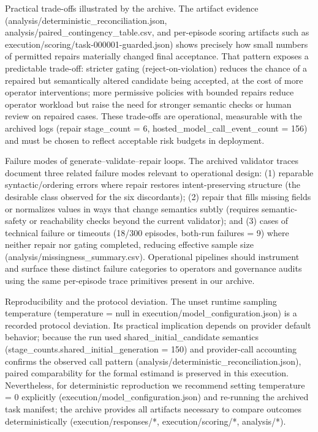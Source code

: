 \documentclass[conference]{IEEEtran}
\begin{document}
Practical trade-offs illustrated by the archive. The artifact evidence (analysis/deterministic\_reconciliation.json, analysis/paired\_contingency\_table.csv, and per-episode scoring artifacts such as execution/scoring/task-000001-guarded.json) shows precisely how small numbers of permitted repairs materially changed final acceptance. That pattern exposes a predictable trade-off: stricter gating (reject-on-violation) reduces the chance of a repaired but semantically altered candidate being accepted, at the cost of more operator interventions; more permissive policies with bounded repairs reduce operator workload but raise the need for stronger semantic checks or human review on repaired cases. These trade-offs are operational, measurable with the archived logs (repair stage\_count = 6, hosted\_model\_call\_event\_count = 156) and must be chosen to reflect acceptable risk budgets in deployment.

Failure modes of generate--validate--repair loops. The archived validator traces document three related failure modes relevant to operational design: (1) reparable syntactic/ordering errors where repair restores intent-preserving structure (the desirable class observed for the six discordants); (2) repair that fills missing fields or normalizes values in ways that change semantics subtly (requires semantic-safety or reachability checks beyond the current validator); and (3) cases of technical failure or timeouts (18/300 episodes, both-run failures = 9) where neither repair nor gating completed, reducing effective sample size (analysis/missingness\_summary.csv). Operational pipelines should instrument and surface these distinct failure categories to operators and governance audits using the same per-episode trace primitives present in our archive.

Reproducibility and the protocol deviation. The unset runtime sampling temperature (temperature = null in execution/model\_configuration.json) is a recorded protocol deviation. Its practical implication depends on provider default behavior; because the run used shared\_initial\_candidate semantics (stage\_counts.shared\_initial\_generation = 150) and provider-call accounting confirms the observed call pattern (analysis/deterministic\_reconciliation.json), paired comparability for the formal estimand is preserved in this execution. Nevertheless, for deterministic reproduction we recommend setting temperature = 0 explicitly (execution/model\_configuration.json) and re-running the archived task manifest; the archive provides all artifacts necessary to compare outcomes deterministically (execution/responses/*, execution/scoring/*, analysis/*).
\end{document}
